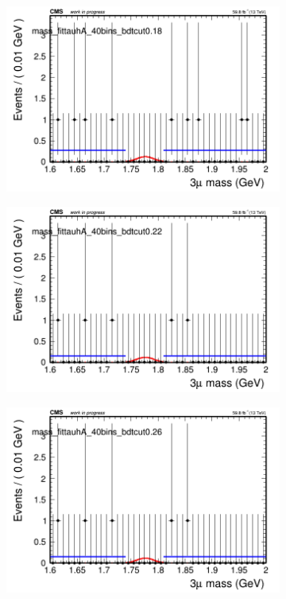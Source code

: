 \begin{figure}[H]
\begin{subfigure}{0.2\textwidth}
        \caption{}
    \end{subfigure}
    \begin{subfigure}{0.2\textwidth}
        \includegraphics[width=\textwidth]{flat_fit/plots/tauhA/massfit_tauhA_40bins_bdtcut0.18.png}
        \caption{}
    \end{subfigure}
    \begin{subfigure}{0.2\textwidth}
        \includegraphics[width=\textwidth]{flat_fit/plots/tauhA/massfit_tauhA_40bins_bdtcut0.22.png}
        \caption{}
    \end{subfigure}
    \begin{subfigure}{0.2\textwidth}
        \includegraphics[width=\textwidth]{flat_fit/plots/tauhA/massfit_tauhA_40bins_bdtcut0.26.png}

\end{subfigure}
\end{figure}
